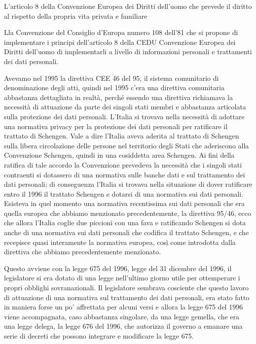 L'articolo 8 della Convenzione Europea dei Diritti dell'uomo che prevede il diritto al rispetto della propria vita privata e familiare

Lla Convenzione del Consiglio d'Europa numero 108 dell'81 che si propone di implementare i principi dell'articolo 8 della CEDU Convenzione Europea dei Diritti dell'uomo di implementarli a livello di informazioni personali e trattamenti dei dati personali. 

Avevamo nel 1995 la direttiva CEE 46 del 95, il sistema comunitario di denominazione degli atti, quindi nel 1995 c'era una direttiva comunitaria abbastanza dettagliata in realtà, perché essendo una direttiva richiamava la necessità di attuazione da parte dei singoli stati membri e abbastanza articolata sulla protezione dei dati personali. 
L'Italia si trovava nella necessità di adottare una normativa privacy per la protezione dei dati personali per ratificare il trattato di Schengen. Vale a dire l'Italia aveva aderita al trattato di Schengen sulla libera circolazione delle persone nel territorio degli Stati che aderiscono alla Convenzione Schengen, quindi in una cosiddetta area Schengen. Ai fini della ratifica di tale accordo la Convenzione prevedeva la necessità che i singoli stati contraenti si dotassero di una normativa sulle banche dati e sul trattamento dei dati personali; di conseguenza l'Italia si trovava nella situazione di dover ratificare entro il 1996 il trattato Schengen e dotarsi di una normativa sui dati personali. 
Esisteva in quel momento una normativa recentissima  sui dati personali che era quella europea che abbiamo menzionato precedentemente, la direttiva 95/46, ecco che allora l'Italia coglie due piccioni con una fava e ratificando Schengen si dota anche di una normativa sui dati personali che codifica il trattato Schengen, e che recepisce quasi interamente la normativa europea, così come introdotta dalla direttiva che abbiamo precedentemente menzionato. 

Questo avviene con la legge 675 del 1996, legge del 31 dicembre del 1996, il legislatore si era dotato di una legge nell'ultimo giorno utile per ottemperare i propri obblighi sovranazionali.
Il legislatore sembrava cosciente che questo lavoro di attuazione di una normativa sul trattamento dei dati personali, era stato fatto in maniera forse un po' affrettata per alcuni versi e allora la legge 675 del 1996 viene accompagnata, caso abbastanza singolare, da una legge gemella, che era una legge delega, la legge 676 del 1996, che autorizza il governo a emanare una serie di decreti che possono integrare e modificare la legge 675. 

